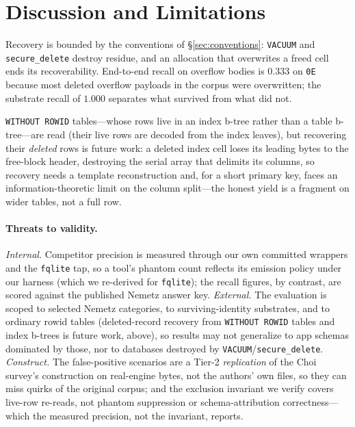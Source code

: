 \documentclass[10pt,a4paper]{article}
\newcommand{\code}[1]{\texttt{#1}}
\begin{document}
\section{Discussion and Limitations}\label{sec:discussion}

Recovery is bounded by the conventions of \S\ref{sec:conventions}: \code{VACUUM} and
\code{secure\_delete} destroy residue, and an allocation that overwrites a freed cell
ends its recoverability. End-to-end recall on overflow bodies is $0.333$ on \code{0E}
because most deleted overflow payloads in the corpus were overwritten; the substrate
recall of $1.000$ separates what survived from what did not.

\code{WITHOUT ROWID} tables---whose rows live in an index b-tree rather than a table
b-tree---are read (their live rows are decoded from the index leaves), but recovering
their \emph{deleted} rows is future work: a deleted index cell loses its leading bytes to
the free-block header, destroying the serial array that delimits its columns, so recovery
needs a template reconstruction and, for a short primary key, faces an information-theoretic
limit on the column split---the honest yield is a fragment on wider tables, not a full row.

\paragraph{Threats to validity.}
\emph{Internal.} Competitor precision is measured through our own committed wrappers and
the \code{fqlite} tap, so a tool's phantom count reflects its emission policy under our
harness (which we re-derived for \code{fqlite}); the recall figures, by contrast, are
scored against the published Nemetz answer key.
\emph{External.} The evaluation is scoped to selected Nemetz categories, to
surviving-identity substrates, and to ordinary rowid tables (deleted-record recovery from
\code{WITHOUT ROWID} tables and index b-trees is future work, above), so results may not
generalize to app schemas dominated by those, nor to databases destroyed by
\code{VACUUM}/\code{secure\_delete}.
\emph{Construct.} The false-positive scenarios are a Tier-2 \emph{replication} of the
Choi survey's construction on real-engine bytes, not the authors' own files, so they can
miss quirks of the original corpus; and the exclusion invariant we verify covers live-row
re-reads, not phantom suppression or schema-attribution correctness---which the measured
precision, not the invariant, reports.
\end{document}

